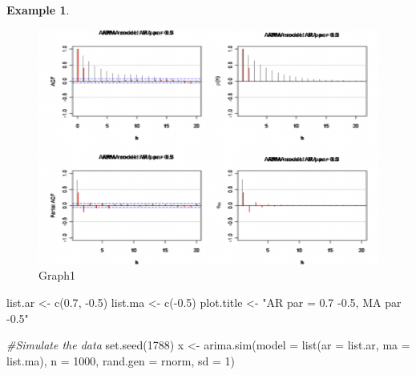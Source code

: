 \documentclass[
]{book}
\newenvironment{Shaded}{\begin{snugshade}}{\end{snugshade}}
\newcommand{\AttributeTok}[1]{\textcolor[rgb]{0.77,0.63,0.00}{#1}}
\newcommand{\CommentTok}[1]{\textcolor[rgb]{0.56,0.35,0.01}{\textit{#1}}}
\newcommand{\DecValTok}[1]{\textcolor[rgb]{0.00,0.00,0.81}{#1}}
\newcommand{\FloatTok}[1]{\textcolor[rgb]{0.00,0.00,0.81}{#1}}
\newcommand{\FunctionTok}[1]{\textcolor[rgb]{0.00,0.00,0.00}{#1}}
\newcommand{\NormalTok}[1]{#1}
\newcommand{\OtherTok}[1]{\textcolor[rgb]{0.56,0.35,0.01}{#1}}
\newcommand{\SpecialCharTok}[1]{\textcolor[rgb]{0.00,0.00,0.00}{#1}}
\newcommand{\StringTok}[1]{\textcolor[rgb]{0.31,0.60,0.02}{#1}}
\theoremstyle{definition}
\theoremstyle{definition}
\newtheorem{example}{Example}[chapter]
\theoremstyle{definition}
\theoremstyle{definition}
\theoremstyle{remark}
\begin{document}
\begin{example}
\begin{figure}
\centering
\includegraphics{True-and-Est-ACF-PACF-graph1.png}
\caption{Graph1}
\end{figure}

\begin{Shaded}
\begin{Highlighting}[]
\NormalTok{list.ar }\OtherTok{\textless{}{-}} \FunctionTok{c}\NormalTok{(}\FloatTok{0.7}\NormalTok{, }\SpecialCharTok{{-}}\FloatTok{0.5}\NormalTok{) }
\NormalTok{list.ma }\OtherTok{\textless{}{-}} \FunctionTok{c}\NormalTok{(}\SpecialCharTok{{-}}\FloatTok{0.5}\NormalTok{)}
\NormalTok{plot.title }\OtherTok{\textless{}{-}} \StringTok{"AR par = 0.7 {-}0.5, MA par {-}0.5"}
\end{Highlighting}
\end{Shaded}

\begin{Shaded}
\begin{Highlighting}[]
  \CommentTok{\#Simulate the data}
  \FunctionTok{set.seed}\NormalTok{(}\DecValTok{1788}\NormalTok{)}
\NormalTok{  x }\OtherTok{\textless{}{-}} \FunctionTok{arima.sim}\NormalTok{(}\AttributeTok{model =} \FunctionTok{list}\NormalTok{(}\AttributeTok{ar =}\NormalTok{ list.ar, }\AttributeTok{ma =}\NormalTok{ list.ma), }\AttributeTok{n =} \DecValTok{1000}\NormalTok{,}
    \AttributeTok{rand.gen =}\NormalTok{ rnorm, }\AttributeTok{sd =} \DecValTok{1}\NormalTok{)}
  

\end{Highlighting}
\end{Shaded}
\end{example}
\end{document}
